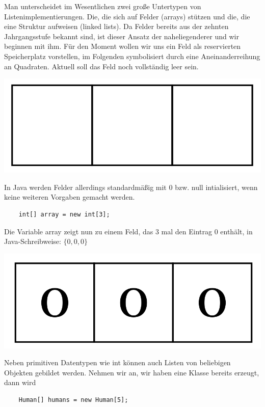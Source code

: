 \documentclass{article}
\begin{document}
Man unterscheidet im Wesentlichen zwei große Untertypen von Listenimplementierungen. Die, die sich auf Felder (arrays) stützen und
die, die eine  Struktur aufweisen (linked lists). Da Felder bereits aus der zehnten Jahrgangsstufe bekannt sind, ist dieser Ansatz der naheliegenderer und wir beginnen mit ihm. 
Für den Moment wollen wir uns ein Feld als reservierten Speicherplatz vorstellen, im Folgenden symbolisiert durch
eine Aneinanderreihung an Quadraten. Aktuell soll das Feld noch vollständig leer sein.
\begin{center}
    \includegraphics[scale=0.15]{../../media/empty_arr.png}
\end{center}
In Java werden Felder allerdings standardmäßig mit 0 bzw. null intialisiert, wenn keine weiteren Vorgaben gemacht werden.
\bsp
\begin{verbatim}
    int[] array = new int[3];
\end{verbatim}
Die Variable array zeigt nun zu einem Feld, das 3 mal den Eintrag 0 enthält, 
in Java-Schreibweise: $\{0,0,0\}$ \\

\begin{center}
    \includegraphics[scale = 0.15]{../../media/zero_arr.png}
\end{center}

Neben primitiven Datentypen wie int können auch Listen von beliebigen Objekten gebildet werden. Nehmen wir an, wir haben
eine Klasse bereits erzeugt, dann wird

\begin{verbatim}
    Human[] humans = new Human[5];
\end{verbatim}
\end{document}
